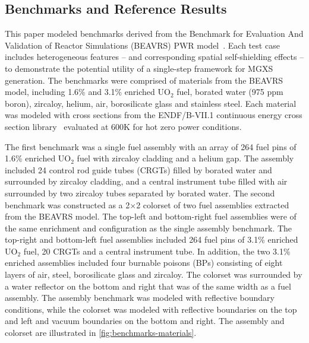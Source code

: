 \subsection{Benchmarks and Reference Results}
\label{subsec:benchmarks}

This paper modeled benchmarks derived from the Benchmark for Evaluation And Validation of Reactor Simulations (BEAVRS) PWR model~\cite{horelik2013beavrs}. Each test case includes heterogeneous features -- and corresponding spatial self-shielding effects -- to demonstrate the potential utility of a single-step framework for MGXS generation. The benchmarks were comprised of materials from the BEAVRS model, including 1.6\% and 3.1\% enriched UO$_2$ fuel, borated water (975 ppm boron), zircaloy, helium, air, borosilicate glass and stainless steel. Each material was modeled with cross sections from the ENDF/B-VII.1 continuous energy cross section library~\cite{mcnpx2003manual} evaluated at 600K for hot zero power conditions. 


The first benchmark was a single fuel assembly with an array of 264 fuel pins of 1.6\% enriched UO$_2$ fuel with zircaloy cladding and a helium gap. The assembly included 24 control rod guide tubes (CRGTs) filled by borated water and surrounded by zircaloy cladding, and a central instrument tube filled with air surrounded by two zircaloy tubes separated by borated water. The second benchmark was constructed as a 2$\times$2 colorset of two fuel assemblies extracted from the BEAVRS model. The top-left and bottom-right fuel assemblies were of the same enrichment and configuration as the single assembly benchmark. The top-right and bottom-left fuel assemblies included 264 fuel pins of 3.1\% enriched UO$_2$ fuel, 20 CRGTs and a central instrument tube. In addition, the two 3.1\% enriched assemblies included four burnable poisons (BPs) consisting of eight layers of air, steel, borosilicate glass and zircaloy. The colorset was surrounded by a water reflector on the bottom and right that was of the same width as a fuel assembly. The assembly benchmark was modeled with reflective boundary conditions, while the colorset was modeled with reflective boundaries on the top and left and vacuum boundaries on the bottom and right. The assembly and colorset are illustrated in \autoref{fig:benchmarks-materials}.

